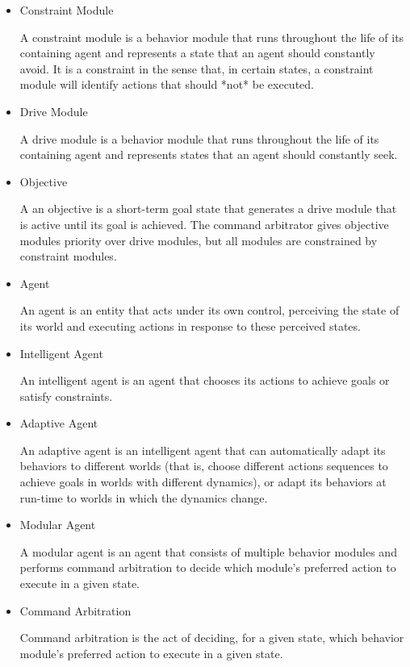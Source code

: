 \begin{itemize}
\item Constraint Module

  A constraint module is a behavior module that runs throughout the
  life of its containing agent and represents a state that an agent
  should constantly avoid.  It is a constraint in the sense that, in
  certain states, a constraint module will identify actions that should
  *not* be executed.

\item Drive Module

  A drive module is a behavior module that runs throughout the
  life of its containing agent and represents states that an agent
  should constantly seek.

\item Objective

  A an objective is a short-term goal state that generates a drive
  module that is active until its goal is achieved.  The command
  arbitrator gives objective modules priority over drive modules, but
  all modules are constrained by constraint modules.

\item Agent

  An agent is an entity that acts under its own control, perceiving
  the state of its world and executing actions in response to these
  perceived states.

\item Intelligent Agent

  An intelligent agent is an agent that chooses its actions to achieve
  goals or satisfy constraints.

\item Adaptive Agent

  An adaptive agent is an intelligent agent that can automatically
  adapt its behaviors to different worlds (that is, choose different
  actions sequences to achieve goals in worlds with different
  dynamics), or adapt its behaviors at run-time to worlds in which the
  dynamics change.

\item Modular Agent

  A modular agent is an agent that consists of multiple behavior
  modules and performs command arbitration to decide which module's
  preferred action to execute in a given state.

\item Command Arbitration

  Command arbitration is the act of deciding, for a given state, which
  behavior module's preferred action to execute in a given state.
\end{itemize}

